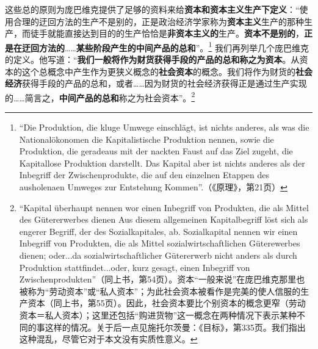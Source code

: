 \documentclass[fontset=fandol, a4paper, 12pt, openright]{ctexbook}
\begin{document}
这些总的原则为庞巴维克提供了足够的资料来给\textbf{资本和资本主义生产下定义}：“使用合理的迂回方法的生产不是别的，正是政治经济学家称为\textbf{资本主义}生产的那种生产，而徒手就能直接达到目的的生产恰恰是\textbf{非资本主义的}生产。\textbf{资本不是别的}，\textbf{正是在迂回方法的}……\textbf{某些阶段产生的中间产品的总和}”。\footnote{``Die Produktion, die kluge Umwege einschl\"{a}gt, ist nichts anderes, als was die National\"{o}konomen die Kapitalistische Produktion nennen, sowie die Produktion, die geradeaus mit der nackten Faust auf das Ziel zugeht, die Kapitallose Produktion darstellt. Das Kapital aber ist nichts anderes als der Inbegriff der Zwischenprodukte, die auf den einzelnen Etappen des ausholenaen Umweges zur Entstehung Kommen''.（《原理》，第21页）} 我们再列举几个庞巴维克的定义。他写道：“\textbf{我们一般将作为财货获得手段的产品的总和称之为资本}。从资本的这个总概念中产生作为更狭义概念的\textbf{社会资本}的概念。我们将作为财货的\textbf{社会经济}获得手段的产品的总和，或者……因为财货的社会经济获得正是通过生产实现的……简言之，\textbf{中间产品的总和}称之为社会资本”。\footnote{``Kapital \"{u}berhaupt nennen wor einen Inbegriff von Produkten, die als Mittel des G\"{u}tererwerbes dienen Aus diesem allgemeinen Kapitalbegriff l\"{o}st sich als engerer Begriff, der des Sozialkapitales, ab. Sozialkapital nennen wir einen Inbegriff von Produkten, die als Mittel sozialwirtschaftlichen G\"{u}terewerbes dienen; oder...da sozialwirtschaftlicher G\"{u}tererwerb nicht anders als durch Produktion stattfindet...oder, kurz gesagt, einen Inbegriff von Zwischenprodukten''（同上书，第54页）。资本“一般来说”在庞巴维克那里也被称为“劳动资本”或“私人资本”；为此社会资本被看作是完美的使人信服的生产资本（同上书，第55页）。因此，社会资本要比个别资本的概念更窄（劳动资本＝私人资本）；这里还包括“购进货物”这一概念在两种情况下表示某种不同的事这样的情况。关于后一点见施托尔茨曼：《目标》，第335页。我们指出这种混乱，尽管它对于本文没有实质性意义。}
\end{document}
